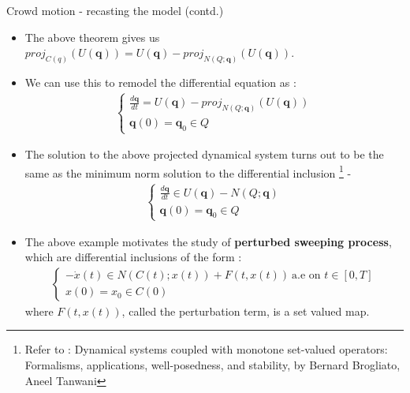 \documentclass[8pt,aspectratio=169]{beamer}
\begin{document}
\begin{frame}{Crowd motion - recasting the model (contd.)}
    \begin{itemize}
        \item The above theorem gives us $proj_{C(q)}(U(\boldsymbol{q})) = U(\boldsymbol{q}) - proj_{N(Q; \boldsymbol{q})}(U(\boldsymbol{q}))$.
        \item We can use this to remodel the differential equation as :
        \begin{align*}
            \begin{cases}
                \frac{d\boldsymbol{q}}{dt} = U(\boldsymbol{q}) - proj_{N(Q; \boldsymbol{q})}(U(\boldsymbol{q}))\\
                \boldsymbol{q}(0) = \boldsymbol{q}_0 \in Q
            \end{cases}
        \end{align*}
        \item The solution to the above projected dynamical system turns out to be the same as the minimum norm solution to the differential inclusion \footnote{Refer to : Dynamical systems coupled with monotone set-valued operators: Formalisms, applications, well-posedness, and stability, by Bernard Brogliato, Aneel Tanwani} - 
        \begin{align*}
            \begin{cases}
                \frac{d\boldsymbol{q}}{dt} \in U(\boldsymbol{q}) - N(Q; \boldsymbol{q})\\
                \boldsymbol{q}(0) = \boldsymbol{q}_0 \in Q
            \end{cases}
        \end{align*}
        \item The above example motivates the study of \textbf{perturbed sweeping process}, which are differential inclusions of the form : 
        \begin{align*}
            \begin{cases}
                -\dot{x}(t) \in N(C(t); x(t)) + F(t, x(t)) \ \text{a.e on } t \in [0, T]\\
                x(0) = x_0 \in C(0)
            \end{cases}            
        \end{align*}
        where $F(t, x(t))$, called the perturbation term, is a set valued map.
    \end{itemize}   
\end{frame}
\end{document}
